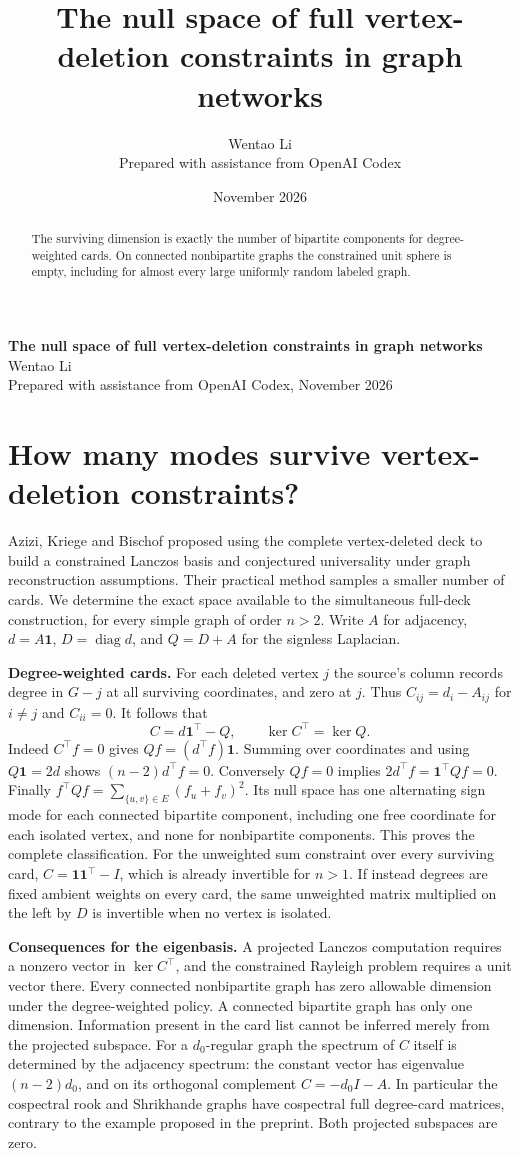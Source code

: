 \documentclass[11pt]{article}
\title{The null space of full vertex-deletion constraints in graph networks}
\author{Wentao Li\\{\small Prepared with assistance from OpenAI Codex}}
\date{November 2026}
\begin{document}
\begin{center}{\Large\bfseries The null space of full vertex-deletion constraints in graph networks}\\[3pt]Wentao Li\\{\small Prepared with assistance from OpenAI Codex, November 2026}\end{center}
\begin{abstract}
The surviving dimension is exactly the number of bipartite components for degree-weighted cards. On connected nonbipartite graphs the constrained unit sphere is empty, including for almost every large uniformly random labeled graph.
\end{abstract}
\section*{How many modes survive vertex-deletion constraints?}
Azizi, Kriege and Bischof proposed using the complete vertex-deleted deck to build a constrained Lanczos basis and conjectured universality under graph reconstruction assumptions. Their practical method samples a smaller number of cards. We determine the exact space available to the simultaneous full-deck construction, for every simple graph of order $n>2$. Write $A$ for adjacency, $d=A\mathbf1$, $D=\operatorname{diag}d$, and $Q=D+A$ for the signless Laplacian.

\textbf{Degree-weighted cards.} For each deleted vertex $j$ the source's column records degree in $G-j$ at all surviving coordinates, and zero at $j$. Thus $C_{ij}=d_i-A_{ij}$ for $i\ne j$ and $C_{ii}=0$. It follows that
\[
 C=d\mathbf1^\top-Q,\qquad \ker C^\top=\ker Q .
\]
Indeed $C^\top f=0$ gives $Qf=(d^\top f)\mathbf1$. Summing over coordinates and using $Q\mathbf1=2d$ shows $(n-2)d^\top f=0$. Conversely $Qf=0$ implies $2d^\top f=\mathbf1^\top Qf=0$. Finally $f^\top Qf=\sum_{\{u,v\}\in E}(f_u+f_v)^2$. Its null space has one alternating sign mode for each connected bipartite component, including one free coordinate for each isolated vertex, and none for nonbipartite components. This proves the complete classification. For the unweighted sum constraint over every surviving card, $C=\mathbf1\mathbf1^\top-I$, which is already invertible for $n>1$. If instead degrees are fixed ambient weights on every card, the same unweighted matrix multiplied on the left by $D$ is invertible when no vertex is isolated.

\textbf{Consequences for the eigenbasis.} A projected Lanczos computation requires a nonzero vector in $\ker C^\top$, and the constrained Rayleigh problem requires a unit vector there. Every connected nonbipartite graph has zero allowable dimension under the degree-weighted policy. A connected bipartite graph has only one dimension. Information present in the card list cannot be inferred merely from the projected subspace. For a $d_0$-regular graph the spectrum of $C$ itself is determined by the adjacency spectrum: the constant vector has eigenvalue $(n-2)d_0$, and on its orthogonal complement $C=-d_0 I-A$. In particular the cospectral rook and Shrikhande graphs have cospectral full degree-card matrices, contrary to the example proposed in the preprint. Both projected subspaces are zero.
\end{document}
